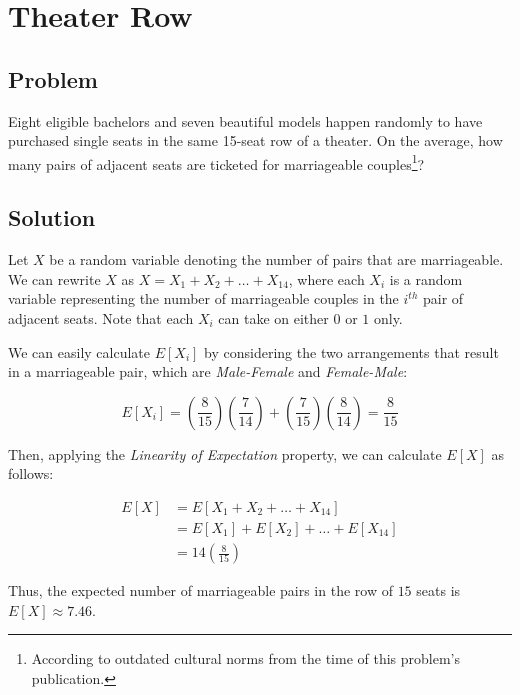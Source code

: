 \documentclass{article}
\date{}
\author{Kaan Aksoy | Feb 22, 2020}
\begin{document}
\maketitle
\section{Theater Row}
\subsection{Problem}
Eight eligible bachelors and seven beautiful models happen randomly to have purchased single seats in the same 15-seat row of a theater. On the average, how many pairs of adjacent seats are ticketed for marriageable couples\footnote[1]{According to outdated cultural norms from the time of this problem's publication.}?

\subsection{Solution}

Let $X$ be a random variable denoting the number of pairs that are marriageable. 
We can rewrite $X$ as $X = X_{1} + X_{2} + \ldots 
+ X_{14}$, where each $X_{i}$ is a random variable 
representing the number of marriageable couples in 
the $i^{th}$ pair of adjacent seats. Note that each 
$X_{i}$ can take on either $0$ or $1$ only.

We can easily calculate $E[X_{i}]$ by considering the 
two arrangements that result in a marriageable pair, which 
are \textit{Male-Female} and \textit{Female-Male}:

$$
E[X_{i}] = \left(\frac{8}{15}\right) 
\left(\frac{7}{14}\right) + 
\left(\frac{7}{15}\right)
\left(\frac{8}{14}\right) = \frac{8}{15}
$$

Then, applying the \textit{Linearity of Expectation} property, we can 
calculate $E[X]$ as follows:

\begin{equation*}
\begin{split}
E[X] &= E[X_{1} + X_{2} + \ldots + X_{14}] \\
&= E[X_{1}] + E[X_{2}] + \ldots + E[X_{14}] \\
&= 14\left(\frac{8}{15}\right)
\end{split}
\end{equation*}

Thus, the expected number of marriageable pairs in the row of $15$ 
seats is $E[X] \approx 7.46$.
\end{document}
